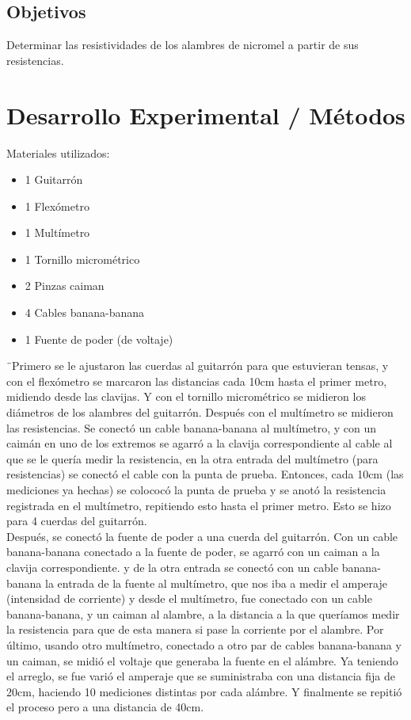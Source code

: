 \documentclass[article,12pt]{elsarticle}
\begin{document}
    \subsection{Objetivos}
    Determinar las resistividades de los alambres de nicromel a partir de sus resistencias.
\section{Desarrollo Experimental / Métodos}
    Materiales utilizados:
    \begin{itemize}
        \item 1 Guitarrón
        \item 1 Flexómetro
        \item 1 Multímetro
        \item 1 Tornillo micrométrico
        \item 2 Pinzas caiman
        \item 4 Cables banana-banana
        \item 1 Fuente de poder (de voltaje)
    \end{itemize}
    ¨Primero se le ajustaron las cuerdas al guitarrón para que estuvieran tensas, y con el flexómetro se marcaron las distancias cada 10cm hasta el primer metro, midiendo desde las clavijas. Y con el tornillo micrométrico se midieron los diámetros de los alambres del guitarrón. 
    Después con el multímetro se midieron las resistencias. Se conectó un cable banana-banana al multímetro, y con un caimán en uno de los extremos se agarró a la clavija correspondiente al cable al que se le quería medir la resistencia, en la otra entrada del multímetro (para resistencias) se conectó el cable con la punta de prueba. Entonces, cada 10cm (las mediciones ya hechas) se colococó la punta de prueba y se anotó la resistencia registrada en el multímetro, repitiendo esto hasta el primer metro.
    Esto se hizo para 4 cuerdas del guitarrón. \\
    Después, se conectó la fuente de poder a una cuerda del guitarrón. Con un cable banana-banana conectado a la fuente de poder, se agarró con un caiman a la clavija correspondiente. y de la otra entrada se conectó con un cable banana-banana la entrada de la fuente al multímetro, que nos iba a medir el amperaje (intensidad de corriente) y desde el multímetro, fue conectado con un cable banana-banana, y un caiman al alambre, a la distancia a la que queríamos medir la resistencia para que de esta manera si pase la corriente por el alambre. Por último, usando otro multímetro, conectado a otro par de cables banana-banana y un caiman, se midió el voltaje que generaba la fuente en el alámbre.
    Ya teniendo el arreglo, se fue varió el amperaje que se suministraba con una distancia fija de 20cm, haciendo 10 mediciones distintas por cada alámbre. Y finalmente se repitió el proceso pero a una distancia de 40cm.
\end{document}
